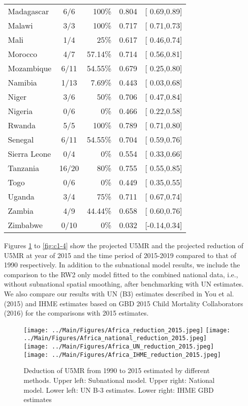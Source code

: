 \documentclass[12pt]{article}\usepackage[]{graphicx}\usepackage[]{color}
\begin{document}
\begin{longtable}{lcrrl}
  Madagascar & 6/6 & 100\% & 0.804 & [ 0.69,0.89] \\ 
  Malawi & 3/3 & 100\% & 0.717 & [ 0.71,0.73] \\ 
  Mali & 1/4 & 25\% & 0.617 & [ 0.46,0.74] \\ 
  Morocco & 4/7 & 57.14\% & 0.714 & [ 0.56,0.81] \\ 
  Mozambique & 6/11 & 54.55\% & 0.679 & [ 0.25,0.80] \\ 
  Namibia & 1/13 & 7.69\% & 0.443 & [ 0.03,0.68] \\ 
  Niger & 3/6 & 50\% & 0.706 & [ 0.47,0.84] \\ 
  Nigeria & 0/6 & 0\% & 0.466 & [ 0.22,0.58] \\ 
  Rwanda & 5/5 & 100\% & 0.789 & [ 0.71,0.80] \\ 
  Senegal & 6/11 & 54.55\% & 0.704 & [ 0.59,0.76] \\ 
  Sierra Leone & 0/4 & 0\% & 0.554 & [ 0.33,0.66] \\ 
  Tanzania & 16/20 & 80\% & 0.755 & [ 0.55,0.85] \\ 
  Togo & 0/6 & 0\% & 0.449 & [ 0.35,0.55] \\ 
  Uganda & 3/4 & 75\% & 0.711 & [ 0.67,0.74] \\ 
  Zambia & 4/9 & 44.44\% & 0.658 & [ 0.60,0.76] \\ 
  Zimbabwe & 0/10 & 0\% & 0.032 & [-0.14,0.34] \\ 
   \bottomrule
\end{longtable}


Figures \ref{fig:c1-1} to \ref{fig:c1-4} show the projected U5MR and the projected reduction of U5MR at year of 2015 and the time period of 2015-2019 compared to that of 1990 respectively. In addition to the subnational model results, we include the comparison to the RW2 only model fitted to the combined national data, i.e., without subnational spatial smoothing, after benchmarking with UN estimates.  We also compare our results with UN (B3) estimates described in You et al. (2015) and IHME estimates based on GBD 2015 Child Mortality Collaborators (2016) for the comparisons with 2015 estimates.  

\begin{figure}[htb]
\texttt{[image: ../Main/Figures/Africa\_reduction\_2015.jpeg]}
\texttt{[image: ../Main/Figures/Africa\_national\_reduction\_2015.jpeg]}
\texttt{[image: ../Main/Figures/Africa\_UN\_reduction\_2015.jpeg]}
\texttt{[image: ../Main/Figures/Africa\_IHME\_reduction\_2015.jpeg]}
\caption{Deduction of U5MR from 1990 to 2015 estimated by different methods. Upper left: Subnational model. Upper right: National model. Lower left: UN B-3 estimates. Lower right: IHME GBD estimates}
\label{fig:c1-1}
\end{figure}
\end{document}
